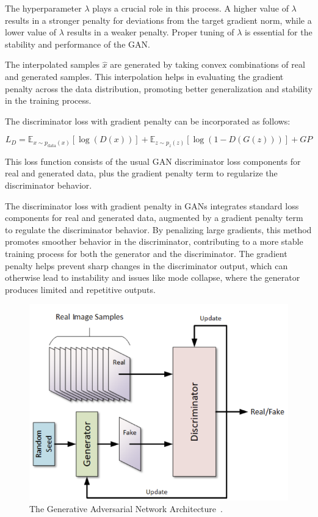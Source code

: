 \documentclass[12pt,a4paper]{report}
\begin{document}
The hyperparameter \(\lambda\) plays a crucial role in this process. A higher value of \(\lambda\) results in a stronger penalty for deviations from the target gradient norm, while a lower value of \(\lambda\) results in a weaker penalty. Proper tuning of \(\lambda\) is essential for the stability and performance of the GAN.

The interpolated samples \(\hat{x}\) are generated by taking convex combinations of real and generated samples. This interpolation helps in evaluating the gradient penalty across the data distribution, promoting better generalization and stability in the training process.

The discriminator loss with gradient penalty can be incorporated as follows:

\begin{equation}
  L_D = \mathbb{E}_{x \sim p_{\text{data}}(x)} \left[ \log(D(x)) \right] + \mathbb{E}_{z \sim p_z(z)} \left[ \log(1 - D(G(z))) \right] + GP
\end{equation}

This loss function consists of the usual GAN discriminator loss components for real and generated data, plus the gradient penalty term to regularize the discriminator behavior.


The discriminator loss with gradient penalty in GANs integrates standard loss components for real and generated data, augmented by a gradient penalty term to regulate the discriminator behavior. By penalizing large gradients, this method promotes smoother behavior in the discriminator, contributing to a more stable training process for both the generator and the discriminator. The gradient penalty helps prevent sharp changes in the discriminator output, which can otherwise lead to instability and issues like mode collapse, where the generator produces limited and repetitive outputs.

\begin{figure}[th]
  \centering
  \includegraphics[scale=0.6]{./pics/gan.png}
  \caption[The Generative Adversarial Network Architecture]{The Generative Adversarial Network Architecture~\cite{gan-photo}.}
  \label{fig:pi6}
\end{figure}
\end{document}

